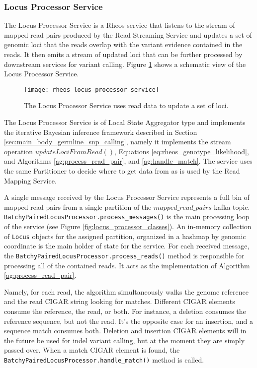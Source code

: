 \subsubsection{Locus Processor Service}

The Locus Processor Service is a Rheos service that listens to the stream of mapped read pairs produced by the Read Streaming Service and updates a set of genomic loci that the reads overlap with the variant evidence contained in the reads. It then emits a stream of updated loci that can be further processed by downstream services for variant calling. Figure \ref{fig:rheos_locus_processor_service} shows a schematic view of the Locus Processor Service.

\begin{figure}[h!]
    \texttt{[image: rheos\_locus\_processor\_service]}
    \centering
    \caption {The Locus Processor Service uses read data to update a set of loci.}
    \label{fig:rheos_locus_processor_service}
\end{figure}

The Locus Processor Service is of Local State Aggregator type and implements the iterative Bayesian inference framework described in Section \ref{sec:main_body_germline_snp_calling}, namely it implements the stream operation $updateLociFromRead()$, Equations \ref{eq:rheos_genotype_likelihood}, and Algorithms \ref{ag:process_read_pair}, and \ref{ag:handle_match}. The service uses the same Partitioner to decide where to get data from as is used by the Read Mapping Service.

A single message received by the Locus Processor Service represents a full bin of mapped read pairs from a single partition of the $mapped\_read\_pairs$ kafka topic. \texttt{BatchyPairedLocusProcessor.process_messages()} is the main processing loop of the service (see Figure \ref{fig:locus_processor_classes}). An in-memory collection of \texttt{Locus} objects for the assigned partition, organized in a hashmap by genomic coordinate is the main holder of state for the service. For each received message, the \texttt{BatchyPairedLocusProcessor.process_reads()} method is responsible for processing all of the contained reads. It acts as the implementation of Algorithm \ref{ag:process_read_pair}.

Namely, for each read, the algorithm simultaneously walks the genome reference and the read CIGAR string looking for matches. Different CIGAR elements consume the reference, the read, or both. For instance, a deletion consumes the reference sequence, but not the read. It's the opposite case for an insertion, and a sequence match consumes both. Deletion and insertion CIGAR elements will in the future be used for indel variant calling, but at the moment they are simply passed over. When a match CIGAR element is found, the \texttt{BatchyPairedLocusProcessor.handle_match()} method is called.

